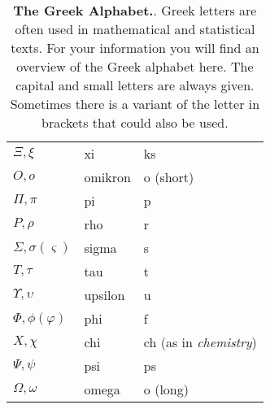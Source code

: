 \begin{table}
\begin{tabular}{lll}
  	$\Xi, \xi$                   & xi            & ks                          \\
  	$O, o$                       & omikron       & o (short)                   \\
  	$\Pi, \pi$                   & pi            & p                           \\
  	$P, \rho$                    & rho           & r                           \\
  	$\Sigma, \sigma (\varsigma)$ & sigma         & s                           \\
  	$T, \tau$                    & tau           & t                           \\
  	$\Upsilon, \upsilon$         & upsilon       & u                           \\
  	$\Phi, \phi (\varphi)$       & phi           & f                           \\
  	$X, \chi$                    & chi           & ch (as in \emph{chemistry}) \\
  	$\Psi, \psi$                 & psi           & ps                          \\
  	$\Omega, \omega$             & omega         & o (long)                    \\
  	\bottomrule
  \end{tabular}
  \caption[The Greek alphabet]{\textbf{The Greek Alphabet.}. Greek letters are often used in mathematical and statistical texts. For your information you will find an overview of the Greek alphabet here. The capital and small letters are always given. Sometimes there is a variant of the letter in brackets that could also be used.}
  \label{tab:greek-alphabet}
\end{table}